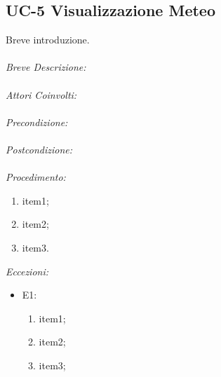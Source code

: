 \subsection{UC-5 Visualizzazione Meteo}
Breve introduzione.
\\
\\
\textit{Breve Descrizione:} 
\\
\\
\textit{Attori Coinvolti:}
\\
\\
\textit{Precondizione:}
\\
\\
\textit{Postcondizione:}
\\
\\
\textit{Procedimento:}
\begin{enumerate}
	\item item1;
	\item item2;
	\item item3.
\end{enumerate}


\textit{Eccezioni:}
\begin{itemize}
	\item E1:
	\begin{enumerate}
		\item item1;
		\item item2;
		\item item3;
	\end{enumerate}
\end{itemize}